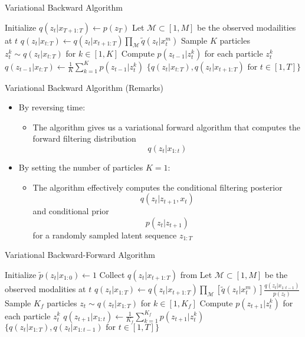 \documentclass{beamer}
\begin{document}
\begin{frame}{Variational Backward Algorithm}
\begin{algorithmic}
\State Initialize $q(z_t|x_{T+1:T})\leftarrow p(z_T)$
\State Let $\mathcal{M}\subset[1,M]$ be the observed modailities at $t$
\State $q(z_t|x_{t:T})\leftarrow q(z_t|x_{t+1:T})\prod_\mathcal{M} \tilde{q}(z_t|x_t^m)$
\State Sample $K$ particles $z_t^k\sim q(z_t|x_{t:T})$ for $k\in[1,K]$
\State Compute $p(z_{t-1}|z_t^k)$ for each particle $z_t^k$
\State $q(z_{t-1}|x_{t:T})\leftarrow\frac{1}{K}\sum_{k=1}^K p(z_{t-1}|z_t^k)$
\EndFor
\State\Return$\{q(z_t|x_{t:T}),q(z_t|x_{t+1:T})\text{ for }t\in[1,T]\}$
\EndFunction
\end{algorithmic}
\end{frame}


\begin{frame}{Variational Backward Algorithm (Remarks)}
\begin{itemize}
\item By reversing time:
\begin{itemize}
\item The algorithm gives us a variational forward algorithm that computes the forward filtering distribution\[
q(z_t|x_{1:t})
\]
\end{itemize}
\item By setting the number of particles $K=1$:
\begin{itemize}
\item The algorithm effectively computes the conditional filtering posterior\[
q(z_t|z_{t+1},x_{t})
\]and conditional prior \[
p(z_t|z_{t+1})
\] for a randomly sampled latent sequence $z_{1:T}$
\end{itemize}
\end{itemize}
\end{frame}


\begin{frame}{Variational Backward-Forward Algorithm}
\begin{algorithmic}
\State Initialize $\tilde{p}(z_t|x_{1:0})\leftarrow 1$
\State Collect $q(z_t|x_{t+1:T})$ from 
\State Let $\mathcal{M}\subset[1,M]$ be the observed modalities at $t$
\State $q(z_t|x_{1:T})\leftarrow q(z_t|x_{t+1:T})\prod_\mathcal{M}[\tilde{q}(z_t|x_t^m)]\frac{q(z_t|x_{1:t-1})}{p(z_t)}$
\State Sample $K_f$ particles $z_t\sim q(z_t|x_{1:T})$ for $k\in[1,K_f]$
\State Compute $p(z_{t+1}|z_t^k)$ for each particle $z_t^k$
\State $q(z_{t+1}|x_{1:t})\leftarrow\frac{1}{K_f}\sum_{k=1}^{K_f}p(z_{t+1}|z_t^k)$
\EndFor
\State \Return$\{q(z_t|x_{1:T}),q(z_t|x_{1:t-1})\text{ for }t\in[1,T]\}$
\EndFunction
\end{algorithmic}
\end{frame}
\end{document}
